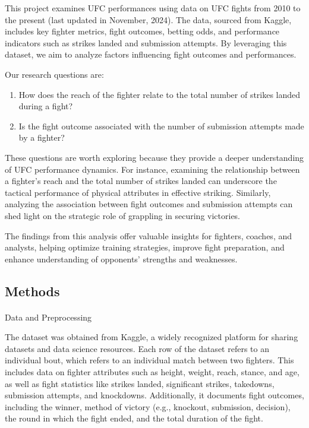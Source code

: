 \documentclass[
  letterpaper,
  DIV=11,
  numbers=noendperiod]{scrartcl}
\makeatletter
\let\oldparagraph\paragraph
\renewcommand{\paragraph}{
    \@ifstar
      \xxxParagraphStar
      \xxxParagraphNoStar
  }
\newcommand{\xxxParagraphStar}[1]{\oldparagraph*{#1}\mbox{}}
\newcommand{\xxxParagraphNoStar}[1]{\oldparagraph{#1}\mbox{}}
\providecommand{\tightlist}{%
  \setlength{\itemsep}{0pt}\setlength{\parskip}{0pt}}\usepackage{longtable,booktabs,array}
\makeatother
\begin{document}
This project examines UFC performances using data on UFC fights from
2010 to the present (last updated in November, 2024). The data, sourced
from Kaggle, includes key fighter metrics, fight outcomes, betting odds,
and performance indicators such as strikes landed and submission
attempts. By leveraging this dataset, we aim to analyze factors
influencing fight outcomes and performances.

Our research questions are:

\begin{enumerate}
\def\labelenumi{\arabic{enumi}.}
\tightlist
\item
  How does the reach of the fighter relate to the total number of
  strikes landed during a fight?
\item
  Is the fight outcome associated with the number of submission attempts
  made by a fighter?
\end{enumerate}

These questions are worth exploring because they provide a deeper
understanding of UFC performance dynamics. For instance, examining the
relationship between a fighter's reach and the total number of strikes
landed can underscore the tactical performance of physical attributes in
effective striking. Similarly, analyzing the association between fight
outcomes and submission attempts can shed light on the strategic role of
grappling in securing victories.

The findings from this analysis offer valuable insights for fighters,
coaches, and analysts, helping optimize training strategies, improve
fight preparation, and enhance understanding of opponents' strengths and
weaknesses.

\subsection{Methods}\label{methods}

\paragraph{Data and Preprocessing}\label{data-and-preprocessing}

The dataset was obtained from Kaggle, a widely recognized platform for
sharing datasets and data science resources. Each row of the dataset
refers to an individual bout, which refers to an individual match
between two fighters. This includes data on fighter attributes such as
height, weight, reach, stance, and age, as well as fight statistics like
strikes landed, significant strikes, takedowns, submission attempts, and
knockdowns. Additionally, it documents fight outcomes, including the
winner, method of victory (e.g., knockout, submission, decision), the
round in which the fight ended, and the total duration of the fight.
\end{document}
